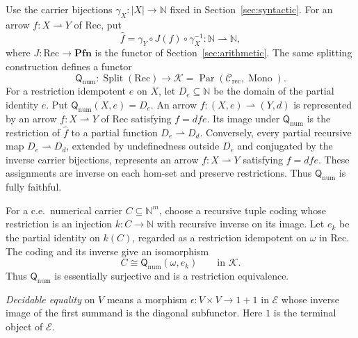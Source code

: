 \documentclass[11pt]{article}
\newcommand{\N}{\mathbb N}
\newcommand{\Pfn}{\mathbf{Pfn}}
\begin{document}
Use the carrier bijections $\gamma_X:|X|\to\N$ fixed in
Section~\ref{sec:syntactic}. For an arrow $f:X\rightharpoonup Y$
of $\mathrm{Rec}$, put
\[
 \widehat f=\gamma_Y\circ J(f)\circ\gamma_X^{-1}
 :\N\rightharpoonup\N,
\]
where $J:\mathrm{Rec}\to\Pfn$ is the functor of
Section~\ref{sec:arithmetic}. The same splitting construction
defines a functor
\[
 \mathsf Q_{\mathrm{num}}:\operatorname{Split}(\mathrm{Rec})
 \longrightarrow\mathcal K
 =\operatorname{Par}(\mathcal C_{\mathrm{rec}},\operatorname{Mono}).
\]
For a restriction idempotent $e$ on $X$, let $D_e\subseteq\N$
be the domain of the partial identity $\widehat e$.
Put $\mathsf Q_{\mathrm{num}}(X,e)=D_e$.
An arrow $f:(X,e)\rightharpoonup(Y,d)$ is represented by an arrow
$f:X\rightharpoonup Y$ of $\mathrm{Rec}$ satisfying $f=dfe$.
Its image under $\mathsf Q_{\mathrm{num}}$ is the restriction of
$\widehat f$ to a partial function $D_e\rightharpoonup D_d$.
Conversely, every partial recursive map $D_e\rightharpoonup D_d$,
extended by undefinedness outside $D_e$ and conjugated by the
inverse carrier bijections, represents an arrow
$f:X\rightharpoonup Y$ satisfying $f=dfe$. These assignments are
inverse on each hom-set and preserve restrictions. Thus
$\mathsf Q_{\mathrm{num}}$ is fully faithful.

For a c.e.\ numerical carrier $C\subseteq\N^m$, choose a recursive
tuple coding whose restriction is an injection $k:C\to\N$ with
recursive inverse on its image. Let $e_k$ be the partial identity
on $k(C)$, regarded as a restriction idempotent on $\omega$ in
$\mathrm{Rec}$. The coding and its inverse give an isomorphism
\[
 C\cong\mathsf Q_{\mathrm{num}}(\omega,e_k)
 \qquad\text{in }\mathcal K.
\]
Thus $\mathsf Q_{\mathrm{num}}$ is essentially surjective and is a
restriction equivalence.

\emph{Decidable equality} on $V$ means a morphism
$\epsilon:V\times V\to1+1$ in $\mathcal E$ whose inverse image of
the first summand is the diagonal subfunctor. Here $1$ is the terminal object of $\mathcal E$.
\end{document}
